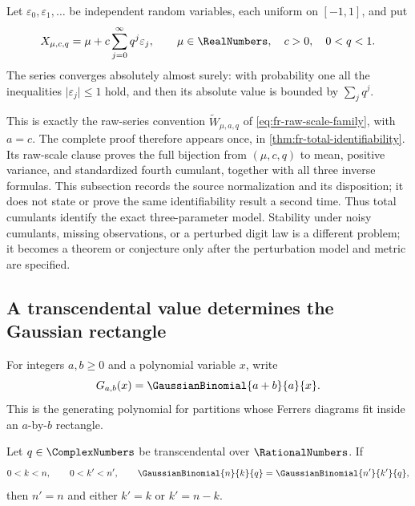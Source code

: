 Let \(\varepsilon_0,\varepsilon_1,\ldots\) be independent random variables,
each uniform on \([-1,1]\), and put
\[
 X_{\mu,c,q}=\mu+c\sum_{j=0}^{\infty}q^j\varepsilon_j,
 \qquad
 \mu\in\RealNumbers,\quad c>0,\quad 0<q<1.
\]
The series converges absolutely almost surely: with probability one all the
inequalities \(\lvert\varepsilon_j\rvert\le1\) hold, and then its absolute value is
bounded by \(\sum_jq^j\).

This is exactly the raw-series convention
\(\widetilde W_{\mu,a,q}\) of
\cref{eq:fr-raw-scale-family}, with \(a=c\).  The complete proof therefore
appears once, in \cref{thm:fr-total-identifiability}.  Its raw-scale clause
proves the full bijection from \((\mu,c,q)\) to mean, positive variance, and
standardized fourth cumulant, together with all three inverse formulas.  This
subsection records the source normalization and its disposition; it does not
state or prove the same identifiability result a second time.
Thus total cumulants identify the exact three-parameter model.  Stability
under noisy cumulants, missing observations, or a perturbed digit law is a
different problem; it becomes a theorem or conjecture only after the
perturbation model and metric are specified.

\subsection{A transcendental value determines the Gaussian rectangle}

For integers \(a,b\ge0\) and a polynomial variable \(x\), write
\[
 G_{a,b}(x)=\GaussianBinomial{a+b}{a}{x}.
\]
This is the generating polynomial for partitions whose Ferrers diagrams fit
inside an \(a\)-by-\(b\) rectangle.

\begin{theorem}
\label{thm:transcendental-gaussian-uniqueness}
Let \(q\in\ComplexNumbers\) be transcendental over \(\RationalNumbers\).  If
\[
 0<k<n,\qquad 0<k'<n',\qquad
 \GaussianBinomial{n}{k}{q}
   =\GaussianBinomial{n'}{k'}{q},
\]
then \(n'=n\) and either \(k'=k\) or \(k'=n-k\).
\end{theorem}

